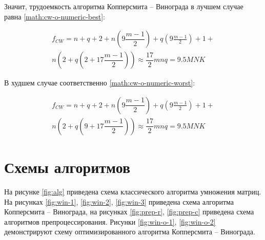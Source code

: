 Значит, трудоемкость алгоритма Копперсмита -- Винограда в лучшем случае равна \ref{math:cw-o-numeric-best}:

\begin{multline}\label{math:cw-o-numeric-best}
	f_{CW} = n + q + 2 + n\left(9 \dfrac{m - 1}{2}\right) + q\left(9 \frac{m - 1}{2}\right) + 1 + \\
	n \left(2 + q\left(2 + 17\dfrac{m - 1}{2}\right)\right)  \approx \dfrac{17}{2}mnq = 9.5MNK 
\end{multline}

В худшем случае соответственно \ref{math:cw-o-numeric-worst}:

\begin{multline}\label{math:cw-o-numeric-worst}
	f_{CW} = n + q + 2 + n\left(9 \dfrac{m - 1}{2}\right) + q\left(9 \frac{m - 1}{2}\right) + 1 + \\
	n \left(2 + q\left(9 + 17\dfrac{m - 1}{2}\right)\right) \approx \dfrac{17}{2}mnq = 9.5MNK 
\end{multline}

\section{Схемы алгоритмов}
На рисунке \ref{fig:alg} приведена схема классического алгоритма умножения матриц. На рисунках \ref{fig:win-1}, \ref{fig:win-2}, \ref{fig:win-3} приведена схема алгоритма Копперсмита -- Винограда, на рисунках  \ref{fig:prep-r}, \ref{fig:prep-c} приведена схема алгоритмов препроцессирования. Рисунки  
\ref{fig:win-o-1}, \ref{fig:win-o-2} демонстрируют схему оптимизированного алгоритма Копперсмита -- Винограда.\newpage

